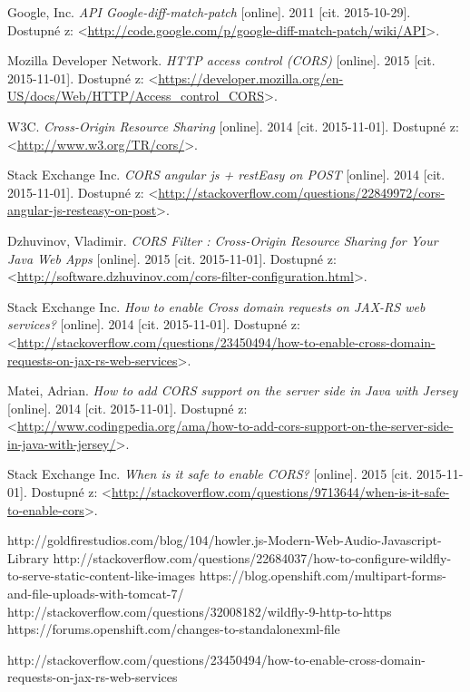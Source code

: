 \documentclass[12pt,oneside]{fithesis2}
\begin{document}
\begin{thebibliography}{59}
  		Google, Inc.
  		\emph{API Google-diff-match-patch}
  		[online].
  		2011
  		[cit. 2015-10-29].
  		Dostupné z: <\url{http://code.google.com/p/google-diff-match-patch/wiki/API}>.
  		
  		Mozilla Developer Network.
  		\emph{HTTP access control (CORS)}
  		[online].
  		2015
  		[cit. 2015-11-01].
  		Dostupné z: <\url{https://developer.mozilla.org/en-US/docs/Web/HTTP/Access_control_CORS}>.
  		
  		W3C.
  		\emph{Cross-Origin Resource Sharing}
  		[online].
  		2014
  		[cit. 2015-11-01].
  		Dostupné z: <\url{http://www.w3.org/TR/cors/}>.
  		
  		Stack Exchange Inc.
  		\emph{CORS angular js + restEasy on POST}
  		[online].
  		2014
  		[cit. 2015-11-01].
  		Dostupné z: <\url{http://stackoverflow.com/questions/22849972/cors-angular-js-resteasy-on-post}>.
		  	
  		Dzhuvinov, Vladimir.
  		\emph{CORS Filter : Cross-Origin Resource Sharing for Your Java Web Apps}
  		[online].
  		2015
  		[cit. 2015-11-01].
  		Dostupné z: <\url{http://software.dzhuvinov.com/cors-filter-configuration.html}>.	  		
 		
  		Stack Exchange Inc.
  		\emph{How to enable Cross domain requests on JAX-RS web services?}
  		[online].
  		2014
  		[cit. 2015-11-01].
  		Dostupné z: <\url{http://stackoverflow.com/questions/23450494/how-to-enable-cross-domain-requests-on-jax-rs-web-services}>.
 		
  		Matei, Adrian.
  		\emph{How to add CORS support on the server side in Java with Jersey}
  		[online].
  		2014
  		[cit. 2015-11-01].
  		Dostupné z: <\url{http://www.codingpedia.org/ama/how-to-add-cors-support-on-the-server-side-in-java-with-jersey/}>.
  		
  		Stack Exchange Inc.
  		\emph{When is it safe to enable CORS?}
  		[online].
  		2015
  		[cit. 2015-11-01].
  		Dostupné z: <\url{http://stackoverflow.com/questions/9713644/when-is-it-safe-to-enable-cors}>.
  		
  		
  		
  		http://goldfirestudios.com/blog/104/howler.js-Modern-Web-Audio-Javascript-Library
  		http://stackoverflow.com/questions/22684037/how-to-configure-wildfly-to-serve-static-content-like-images
  		https://blog.openshift.com/multipart-forms-and-file-uploads-with-tomcat-7/
  		http://stackoverflow.com/questions/32008182/wildfly-9-http-to-https
  		https://forums.openshift.com/changes-to-standalonexml-file
  		
  		
  	http://stackoverflow.com/questions/23450494/how-to-enable-cross-domain-requests-on-jax-rs-web-services
  			
	\end{thebibliography}
\end{document}

